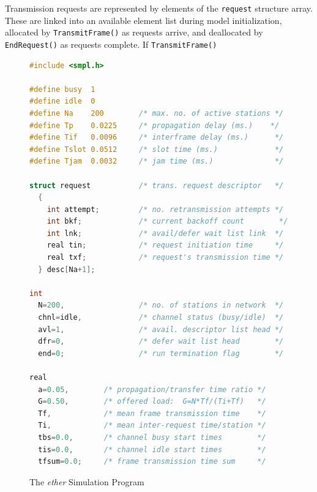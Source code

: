 Transmission requests are represented by elements of the \texttt{request} structure array. These are linked into an available element list during model initialization, allocated by \texttt{TransmitFrame()} as requests arrive, and deallocated by \texttt{EndRequest()} as requests complete. If \texttt{TransmitFrame()}
\begin{figure}[H]
\begin{lstlisting}[basicstyle=\ttfamily\footnotesize,language=C]
#include <smpl.h>

#define busy  1
#define idle  0
#define Na    200        /* max. no. of active stations */
#define Tp    0.0225     /* propagation delay (ms.)    */
#define Tif   0.0096     /* interframe delay (ms.)      */
#define Tslot 0.0512     /* slot time (ms.)             */
#define Tjam  0.0032     /* jam time (ms.)              */

struct request           /* trans. request descriptor   */
  {
    int attempt;         /* no. retransmission attempts */
    int bkf;             /* current backoff count        */
    int lnk;             /* avail/defer wait list link  */
    real tin;            /* request initiation time     */
    real txf;            /* request's transmission time */
  } desc[Na+1];

int
  N=200,                 /* no. of stations in network  */
  chnl=idle,             /* channel status (busy/idle)  */
  avl=1,                 /* avail. descriptor list head */
  dfr=0,                 /* defer wait list head        */
  end=0;                 /* run termination flag        */

real
  a=0.05,        /* propagation/transfer time ratio */
  G=0.50,        /* offered load:  G=N*Tf/(Ti+Tf)   */
  Tf,            /* mean frame transmission time    */
  Ti,            /* mean inter-request time/station */
  tbs=0.0,       /* channel busy start times        */
  tis=0.0,       /* channel idle start times        */
  tfsum=0.0;     /* frame transmission time sum     */
\end{lstlisting}
\caption{The \emph{ether} Simulation Program}
\end{figure}

